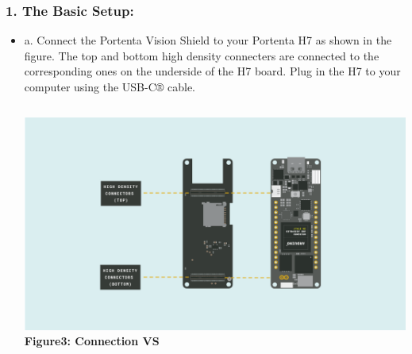 \documentclass[10pt, a4paper]{beamer}
\begin{document}
	\begin{frame}
		\frametitle{1. The Basic Setup:}
		
		\begin{itemize}
			\item {a. Connect the Portenta Vision Shield to your Portenta H7 as shown in the figure. The top and bottom high density connecters are connected to the corresponding ones on the underside of the H7 board. Plug in the H7 to your computer using the USB-C® cable.}
			
				\begin{columns}
					\centering
					\includegraphics[width=\textwidth]{images/Connection VS.png}
					\vspace{0.2cm}
					\textbf{Figure3: Connection VS}
				\end{columns}
				
		\end{itemize}
	\end{frame}
	
		\newpage
		
\end{document}
